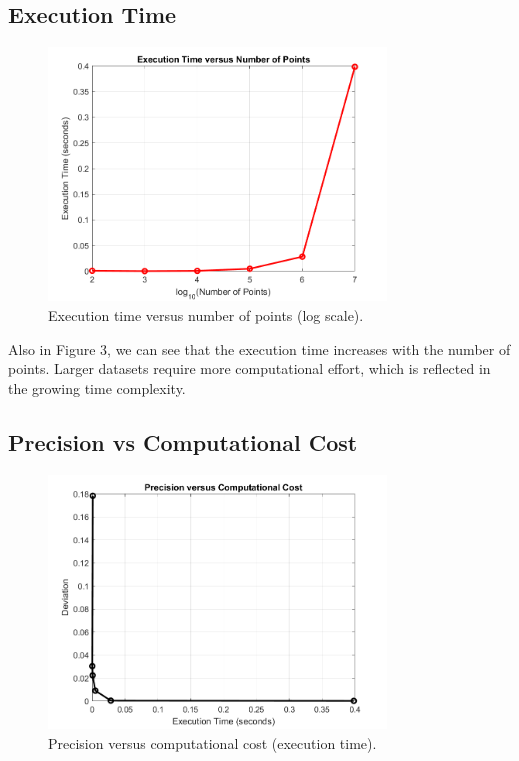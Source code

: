 \documentclass{article}
\begin{document}
\subsection{Execution Time}
\begin{figure}[H]
	\centering
	\includegraphics[width=0.8\textwidth]{Result_Files/execution_time_plot.png}
	\caption{Execution time versus number of points (log scale).}
	\label{fig:execution_time}
\end{figure}

Also in Figure 3, we can see that the execution time increases with the number of points. Larger datasets require more computational effort, which is reflected in the growing time complexity.

\subsection{Precision vs Computational Cost}
\begin{figure}[H]
	\centering
	\includegraphics[width=0.8\textwidth]{Result_Files/precision_vs_cost_plot.png}
	\caption{Precision versus computational cost (execution time).}
	\label{fig:precision_cost}
\end{figure}
\end{document}
